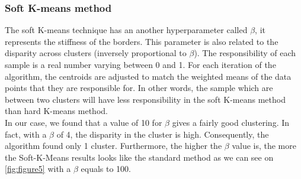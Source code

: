 \subsubsection{Soft K-means method}
The soft K-means technique has an another hyperparameter called $\beta$, it represents the stiffness of the borders. This parameter is also related to the disparity across clusters (inversely proportional to $\beta$). The responsibility of each sample is a real number varying between 0 and 1. For each iteration of the algorithm, the centroids are adjusted to match the weighted means of the data points that they are responsible for.
In other words, the sample which are between two clusters will have less responsibility in the soft K-means method than hard K-means method.\\
In our case, we found that a value of 10 for $\beta$ gives a fairly good clustering. In fact, with a $\beta$ of 4, the disparity in the cluster is high. Consequently, the algorithm found only 1 cluster. Furthermore, the higher the $\beta$ value is, the more the Soft-K-Means results looks like the standard method as we can see on \ref{fig:figure5} with a $\beta$ equals to 100.

